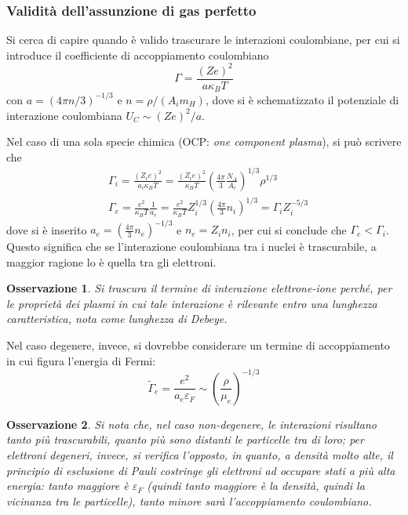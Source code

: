 \documentclass[11pt, a4paper]{scrartcl}
\theoremstyle{style}
\newtheorem{osservazione}{Osservazione}[section]
\theoremstyle{style1}
\numberwithin{equation}{subsection}
\begin{document}
\subsubsection{Validit\`a dell'assunzione di gas perfetto}

Si cerca di capire quando \`e valido trascurare le interazioni coulombiane, per cui si introduce il coefficiente di accoppiamento coulombiano 
\[
\Gamma = \frac{\left(Ze\right) ^2}{a \kappa _B T} 
\] 
con $a = (4 \pi n / 3)^{- 1 / 3}$ e $n= \rho / (A_i m_H)$, dove si \`e schematizzato il potenziale di interazione coulombiana $U_C \sim (Ze)^2 / a$.

Nel caso di una sola specie chimica (OCP: \textit{one component plasma}), si pu\`o scrivere che
\[
\begin{split}
	&\Gamma_i = \frac{(Z_i e)^2}{a_i \kappa _B T } = \frac{(Z_i e)^2}{\kappa _B  T} \left(\frac{4 \pi }{3} \frac{N_A}{A_i}\right) ^{1 / 3 } \rho ^{1/3}\\
	& \Gamma_e = \frac{e^2}{ \kappa _B T } \frac{1}{a_e} = \frac{e^2}{\kappa _B T } Z_i^{1 / 3} \left(\frac{4 \pi }{3} n_i\right) ^{1 / 3} = \Gamma_i Z_i^{-5 / 3}
\end{split}
\] 
dove si \`e inserito $a_e = \left(\frac{4 \pi }{3} n_e\right) ^{ - 1 / 3}$ e $n_e = Z_i n_i $, per cui si conclude che $\Gamma_e < \Gamma_i$.
Questo significa che se l'interazione coulombiana tra i nuclei \`e trascurabile, a maggior ragione lo \`e quella tra gli elettroni.
\begin{osservazione}
Si trascura il termine di interazione elettrone-ione perch\'e, per le propriet\`a dei plasmi in cui tale interazione \`e rilevante entro una lunghezza caratteristica, nota come \textit{lunghezza di Debeye}. 
\end{osservazione}
\noindent Nel caso degenere, invece, si dovrebbe considerare un termine di accoppiamento in cui figura l'energia di Fermi:
\[
\widetilde{\Gamma}_e = \frac{e^2}{a_e \varepsilon _F} \sim \left(\frac{\rho }{\mu _e}\right) ^{ - 1 / 3}
\] 
\begin{osservazione}
Si nota che, nel caso non-degenere, le interazioni risultano tanto pi\`u trascurabili, quanto pi\`u sono distanti le particelle tra di loro; per elettroni degeneri, invece, si verifica l'opposto, in quanto, a densit\`a molto alte, il principio di esclusione di Pauli costringe gli elettroni ad occupare stati a pi\`u alta energia: tanto maggiore \`e $\varepsilon _F$ (quindi tanto maggiore \`e la densit\`a, quindi la vicinanza tra le particelle), tanto minore sar\`a l'accoppiamento coulombiano.
\end{osservazione}
\end{document}
